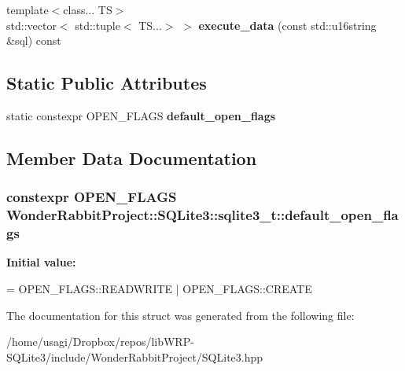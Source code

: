 \begin{DoxyCompactItemize}
\item 
\hypertarget{structWonderRabbitProject_1_1SQLite3_1_1sqlite3__t_a78a2e7aea0803cc6201fbf5aee1e211f}{{\footnotesize template$<$class... T\-S$>$ }\\std\-::vector$<$ std\-::tuple$<$ T\-S...$>$ $>$ {\bfseries execute\-\_\-data} (const std\-::u16string \&sql) const }\label{structWonderRabbitProject_1_1SQLite3_1_1sqlite3__t_a78a2e7aea0803cc6201fbf5aee1e211f}

\end{DoxyCompactItemize}
\subsection*{Static Public Attributes}
\begin{DoxyCompactItemize}
\item 
static constexpr O\-P\-E\-N\-\_\-\-F\-L\-A\-G\-S {\bfseries default\-\_\-open\-\_\-flags}
\end{DoxyCompactItemize}


\subsection{Member Data Documentation}
\hypertarget{structWonderRabbitProject_1_1SQLite3_1_1sqlite3__t_a35b1a27d6aaf21d609df8349bfc9d2ce}{
\subsubsection[{default\-\_\-open\-\_\-flags}]{\setlength{\rightskip}{0pt plus 5cm}constexpr O\-P\-E\-N\-\_\-\-F\-L\-A\-G\-S Wonder\-Rabbit\-Project\-::\-S\-Q\-Lite3\-::sqlite3\-\_\-t\-::default\-\_\-open\-\_\-flags\hspace{0.3cm}{\ttfamily [static]}}}\label{structWonderRabbitProject_1_1SQLite3_1_1sqlite3__t_a35b1a27d6aaf21d609df8349bfc9d2ce}
{\bfseries Initial value\-:}
\begin{DoxyCode}
= OPEN\_FLAGS::READWRITE
        | OPEN\_FLAGS::CREATE
\end{DoxyCode}


The documentation for this struct was generated from the following file\-:\begin{DoxyCompactItemize}
\item 
/home/usagi/\-Dropbox/repos/lib\-W\-R\-P-\/\-S\-Q\-Lite3/include/\-Wonder\-Rabbit\-Project/S\-Q\-Lite3.\-hpp\end{DoxyCompactItemize}
